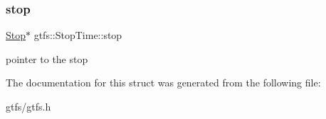 \subsubsection{\texorpdfstring{stop}{stop}}
{\footnotesize\ttfamily \hyperlink{classgtfs_1_1Stop}{Stop}$\ast$ gtfs\+::\+Stop\+Time\+::stop}

pointer to the stop 

The documentation for this struct was generated from the following file\+:\begin{DoxyCompactItemize}
\item 
gtfs/gtfs.\+h\end{DoxyCompactItemize}
